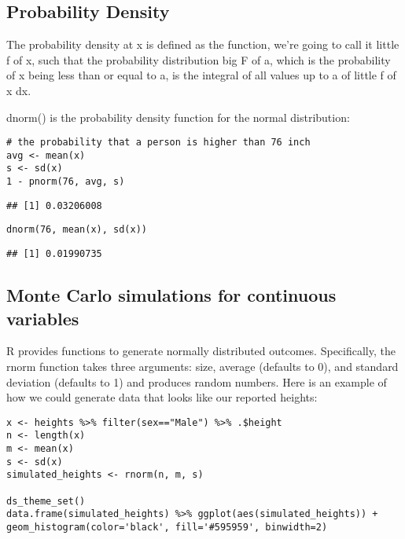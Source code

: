 \documentclass[
]{article}
\begin{document}
\hypertarget{probability-density}{%
\subsection{Probability Density}\label{probability-density}}

The probability density at x is defined as the function, we're going to
call it little f of x, such that the probability distribution big F of
a, which is the probability of x being less than or equal to a, is the
integral of all values up to a of little f of x dx.

dnorm() is the probability density function for the normal distribution:

\begin{verbatim}
# the probability that a person is higher than 76 inch
avg <- mean(x)
s <- sd(x)
1 - pnorm(76, avg, s)
\end{verbatim}

\begin{verbatim}
## [1] 0.03206008
\end{verbatim}

\begin{verbatim}
dnorm(76, mean(x), sd(x))
\end{verbatim}

\begin{verbatim}
## [1] 0.01990735
\end{verbatim}

\hypertarget{monte-carlo-simulations-for-continuous-variables}{%
\subsection{Monte Carlo simulations for continuous
variables}\label{monte-carlo-simulations-for-continuous-variables}}

R provides functions to generate normally distributed outcomes.
Specifically, the rnorm function takes three arguments: size, average
(defaults to 0), and standard deviation (defaults to 1) and produces
random numbers. Here is an example of how we could generate data that
looks like our reported heights:

\begin{verbatim}
x <- heights %>% filter(sex=="Male") %>% .$height
n <- length(x)
m <- mean(x)
s <- sd(x)
simulated_heights <- rnorm(n, m, s)

ds_theme_set()
data.frame(simulated_heights) %>% ggplot(aes(simulated_heights)) + geom_histogram(color='black', fill='#595959', binwidth=2)
\end{verbatim}
\end{document}
